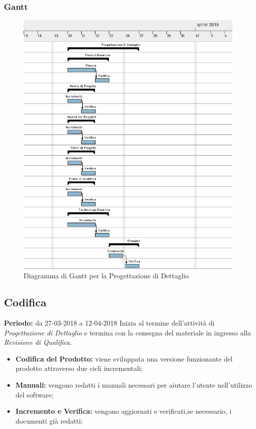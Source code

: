 \subsubsection{Gantt}
\begin{figure}[H]
	\centering 
	\includegraphics[width=1\textwidth]{images/Progettazione-Dettaglio.png}
	\caption{Diagramma di Gantt per la Progettazione di Dettaglio}
	\label{graficobello4} 
\end{figure}
\subsection{Codifica}
    \textbf{Periodo:} da 27-03-2018 a 12-04-2018\Spazio
    Inizia al termine dell'attività di \emph{Progettazione di Dettaglio} e termina con la consegna del materiale in ingresso alla \emph{Revisione di Qualifica}.
    \begin{itemize}
    	\item \textbf{Codifica del Prodotto:} viene sviluppata una versione funzionante del prodotto attraverso due cicli incrementali;
    	\item \textbf{Manuali:} vengono redatti i manuali necessari per aiutare l'utente nell'utilizzo del software;
    	\item \textbf{Incremento e Verifica:} vengono aggiornati e verificati,se necessario, i documenti già redatti;
    \end{itemize}
